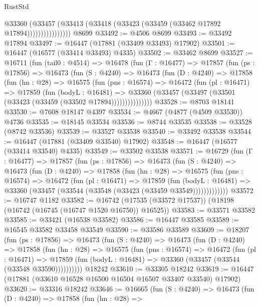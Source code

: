 \begin{lexlean}{RustStd}
\begin{coremodule}
                      @33360
                        (@33457
                          (@33413 (@33418 (@33423 (@33459 (@33462 @17892 @17894))))))))))))))))
    @8699
@33492 := @4506 @8699
@33493 := @33492 @17894
@33497 := @16447 (@17881 (@33409 @33493) @17902)
@33501 := @16447 (@16577 (@33414 @33493) @4335)
@33502 := @33462 @8699
@33527 := @16711
    (fun (tail0 : @4514) =>
    @16478
      (fun (Γ : @16477) =>
      @17857
        (fun (ps : @17856) =>
        @16473
          (fun (S : @4240) =>
          @16473
            (fun (D : @4240) =>
            @17858
              (fun (hn : @28) =>
              @16575
                (fun (pns : @16574) =>
                @16472
                  (fun (pl : @16471) =>
                  @17859
                    (fun (bodyL : @16481) =>
                    @33360 (@33457 (@33497 (@33501 (@33423 (@33459 (@33502 @17894)))))))))))))))
@33528 := @8703 @18141
@33530 := @7608 @18147 @4397
@33534 := @4667 (@4877 (@4509 @33530)) @4736
@33535 := @18145 @33534
@33536 := @8744 @33535
@33538 := @33528 (@8742 @33536)
@33539 := @33527 @33538
@33540 := @33492 @33538
@33544 := @16447 (@17881 (@33409 @33540) @17902)
@33548 := @16447 (@16577 (@33414 @33540) @4335)
@33549 := @33502 @33538
@33571 := @16729
    (fun (Γ : @16477) =>
    @17857
      (fun (ps : @17856) =>
      @16473
        (fun (S : @4240) =>
        @16473
          (fun (D : @4240) =>
          @17858
            (fun (hn : @28) =>
            @16575
              (fun (pns : @16574) =>
              @16472
                (fun (pl : @16471) =>
                @17859
                  (fun (bodyL : @16481) =>
                  @33360 (@33457 (@33544 (@33548 (@33423 (@33459 @33549)))))))))))))
@33572 := @16747 @1182
@33582 := @16742 (@17535 (@33572 @17537)) (@18198 (@16742 (@16745 (@16747 @1520 @16750)) @16525))
@33583 := @33571 @33582
@33585 := @33421 (@16538 @33582)
@33586 := @16447 @33585
@33589 := @16545 @33582 @33458 @33549
@33590 := @33586 @33589
@33609 := @18207
    (fun (ps : @17856) =>
    @16473
      (fun (S : @4240) =>
      @16473
        (fun (D : @4240) =>
        @17858
          (fun (hn : @28) =>
          @16575
            (fun (pns : @16574) =>
            @16472
              (fun (pl : @16471) =>
              @17859 (fun (bodyL : @16481) => @33360 (@33457 (@33544 (@33548 @33590))))))))))
    @18242
@33610 := @33305 @18242
@33619 := @16447 (@17881 (@33610 @16528 @16500 @16504 @16507 @33407 @33540) @17902)
@33620 := @33316 @18242
@33646 := @16665
    (fun (S : @4240) =>
    @16473
      (fun (D : @4240) =>
      @17858
        (fun (hn : @28) =>

\end{coremodule}
\end{lexlean}

